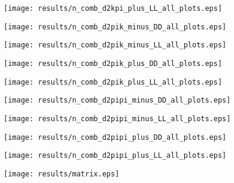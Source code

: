 \documentclass[11pt,a4paper]{article}
\begin{document}
\texttt{[image: results/n\_comb\_d2kpi\_plus\_LL\_all\_plots.eps]}

\texttt{[image: results/n\_comb\_d2pik\_minus\_DD\_all\_plots.eps]}

\texttt{[image: results/n\_comb\_d2pik\_minus\_LL\_all\_plots.eps]}

\texttt{[image: results/n\_comb\_d2pik\_plus\_DD\_all\_plots.eps]}

\texttt{[image: results/n\_comb\_d2pik\_plus\_LL\_all\_plots.eps]}

\texttt{[image: results/n\_comb\_d2pipi\_minus\_DD\_all\_plots.eps]}

\texttt{[image: results/n\_comb\_d2pipi\_minus\_LL\_all\_plots.eps]}

\texttt{[image: results/n\_comb\_d2pipi\_plus\_DD\_all\_plots.eps]}

\texttt{[image: results/n\_comb\_d2pipi\_plus\_LL\_all\_plots.eps]}
\fi

\clearpage
\texttt{[image: results/matrix.eps]}
\end{document}
